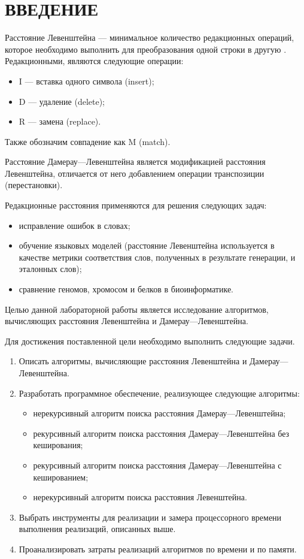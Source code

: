 \chapter*{ВВЕДЕНИЕ}

Расстояние Левенштейна --- минимальное количество редакционных операций, которое необходимо выполнить для преобразования одной строки в другую \cite{levenshtein}. 
Редакционными, являются следующие операции: 
\begin{itemize}
	\item I --- вставка одного символа (insert);
	\item D --- удаление (delete);
	\item R --- замена (replace).
\end{itemize}
Также обозначим совпадение как M (match).

Расстояние Дамерау---Левенштейна является модификацией расстояния Левенштейна, отличается от него добавлением операции транспозиции (перестановки).  

Редакционные расстояния применяются для решения следующих задач:
\begin{itemize}
	\item исправление ошибок в словах;
	\item обучение языковых моделей (расстояние Левенштейна используется в качестве метрики соответствия слов, полученных в результате генерации, и эталонных слов);
	\item сравнение геномов, хромосом и белков в биоинформатике.
\end{itemize}

Целью данной лабораторной работы является исследование алгоритмов, вычисляющих расстояния Левенштейна и Дамерау---Левенштейна.

Для достижения поставленной цели необходимо выполнить следующие задачи.
\begin{enumerate}
	\item Описать алгоритмы, вычисляющие расстояния Левенштейна и Дамерау---Левенштейна.
	\item Разработать программное обеспечение, реализующее следующие алгоритмы:
	\begin{itemize}
		\item нерекурсивный алгоритм поиска расстояния Дамерау---Левенштейна;
		\item рекурсивный алгоритм поиска расстояния Дамерау---Левенштейна без кеширования;
		\item рекурсивный алгоритм поиска расстояния Дамерау---Левенштейна с кешированием;
		\item нерекурсивный алгоритм поиска расстояния Левенштейна.
	\end{itemize}
	\item Выбрать инструменты для реализации и замера процессорного времени выполнения реализаций, описанных выше.
	\item Проанализировать затраты реализаций алгоритмов по времени и по памяти.
\end{enumerate}
